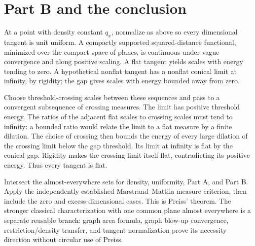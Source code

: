 \section{Part B and the conclusion}
At a point with density constant $q_x$, normalize as above so every dimensional
tangent is unit uniform. A compactly supported squared-distance functional,
minimized over the compact space of planes, is continuous under vague
convergence and along positive scaling. A flat tangent yields scales with
energy tending to zero. A hypothetical nonflat tangent has a nonflat conical
limit at infinity, by rigidity; the gap gives scales with energy bounded
away from zero.

Choose threshold-crossing scales between these sequences and pass to a
convergent subsequence of crossing measures. The limit has positive threshold
energy. The ratios of the adjacent flat scales to crossing scales must tend
to infinity: a bounded ratio would relate the limit to a flat measure by a
finite dilation. The choice of crossing then bounds the energy of every
large dilation of the crossing limit below the gap threshold. Its limit at
infinity is flat by the conical gap. Rigidity makes the crossing limit itself
flat, contradicting its positive energy. Thus every tangent is flat.

Intersect the almost-everywhere sets for density, uniformity, Part A, and
Part B. Apply the independently established Marstrand--Mattila measure
criterion, then include the zero and excess-dimensional cases. This is
Preiss' theorem. The stronger classical characterization with one common
plane almost everywhere is a separate reusable branch: graph area formula,
graph blow-up convergence, restriction/density transfer, and tangent
normalization prove its necessity direction without circular use of Preiss.
